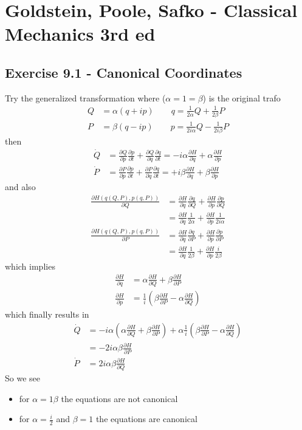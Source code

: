 \documentclass[../main.tex]{subfiles}
\begin{document}
\section{{\sc Goldstein, Poole, Safko} - Classical Mechanics 3rd ed}
\subsection{Exercise 9.1 - Canonical Coordinates}
Try the generalized transformation where ($\alpha=1=\beta$) is the original trafo
\begin{align}
Q&=\alpha(q+ip)\qquad q=\frac{1}{2\alpha}Q+\frac{1}{2\beta}P\\
P&=\beta(q-ip)\qquad p=\frac{1}{2i\alpha}Q-\frac{1}{2i\beta}P
\end{align}
then
\begin{align}
\dot{Q}&=\frac{\partial Q}{\partial p}\frac{\partial p}{\partial t}+\frac{\partial Q}{\partial q}\frac{\partial q}{\partial t}=-i\alpha\frac{\partial H}{\partial q}+\alpha\frac{\partial H}{\partial p}\\
\dot{P}&=\frac{\partial P}{\partial p}\frac{\partial p}{\partial t}+\frac{\partial P}{\partial q}\frac{\partial q}{\partial t}=+i\beta\frac{\partial H}{\partial q}+\beta\frac{\partial H}{\partial p}
\end{align}
and also
\begin{align}
\frac{\partial H(q(Q,P),p(q,P))}{\partial Q}&=\frac{\partial H}{\partial q}\frac{\partial q}{\partial Q}+\frac{\partial H}{\partial p}\frac{\partial p}{\partial Q}\\
&=\frac{\partial H}{\partial q}\frac{1}{2\alpha}+\frac{\partial H}{\partial p}\frac{1}{2i\alpha}\\
\frac{\partial H(q(Q,P),p(q,P))}{\partial P}&=\frac{\partial H}{\partial q}\frac{\partial q}{\partial P}+\frac{\partial H}{\partial p}\frac{\partial p}{\partial P}\\
&=\frac{\partial H}{\partial q}\frac{1}{2\beta}+\frac{\partial H}{\partial p}\frac{i}{2\beta}
\end{align}
which implies
\begin{align}
\frac{\partial H}{\partial q}&=\alpha\frac{\partial H}{\partial Q}+\beta\frac{\partial H}{\partial P}\\
\frac{\partial H}{\partial p}&=\frac{1}{i}\left(\beta\frac{\partial H}{\partial P}-\alpha\frac{\partial H}{\partial Q}\right)
\end{align}
which finally results in 
\begin{align}
\dot{Q}&=-i\alpha\left(\alpha\frac{\partial H}{\partial Q}+\beta\frac{\partial H}{\partial P}\right)+\alpha\frac{1}{i}\left(\beta\frac{\partial H}{\partial P}-\alpha\frac{\partial H}{\partial Q}\right)\\
&=-2i\alpha\beta\frac{\partial H}{\partial P}\\
\dot{P}&=2i\alpha\beta\frac{\partial H}{\partial Q}
\end{align}
So we see
\begin{itemize}
\item for $\alpha=1\beta$ the equations are not canonical
\item for $\alpha=\frac{i}{2}$  and $\beta=1$ the equations are  canonical
\end{itemize}
\end{document}

